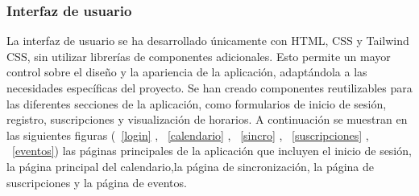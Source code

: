 \subsubsection{Interfaz de usuario}
La interfaz de usuario se ha desarrollado únicamente con HTML, CSS y Tailwind CSS, sin utilizar librerías de componentes adicionales. Esto permite un mayor control sobre el diseño y la apariencia de la aplicación, adaptándola a las necesidades específicas del proyecto. Se han creado componentes reutilizables para las diferentes secciones de la aplicación, como formularios de inicio de sesión, registro, suscripciones y visualización de horarios.
A continuación se muestran en las siguientes figuras (~\ref{login} , ~\ref{calendario} , ~\ref{sincro} , ~\ref{suscripciones} , ~\ref{eventos}) las páginas principales de la aplicación que incluyen el inicio de sesión, la página principal del calendario,la página de sincronización, la página de suscripciones y la página de eventos.

